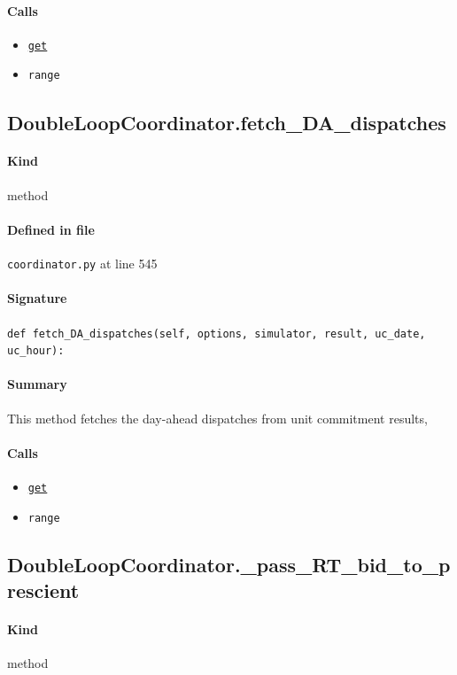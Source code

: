 \documentclass[11pt]{report}
\begin{document}
\paragraph{Calls}
\begin{itemize}[leftmargin=*]
  \item \hyperref[def:tests-test_backcaster.py:DAPrices.get:L294]{\texttt{get}}
  \item \texttt{range}
\end{itemize}
\subsection{DoubleLoopCoordinator.fetch\_DA\_dispatches}
\label{def:coordinator.py:DoubleLoopCoordinator.fetch_DA_dispatches:L545}
\paragraph{Kind} method
\paragraph{Defined in file} \texttt{coordinator.py} at line 545
\paragraph{Signature} \texttt{def fetch\_DA\_dispatches(self, options, simulator, result, uc\_date, uc\_hour):}
\paragraph{Summary} This method fetches the day-ahead dispatches from unit commitment results,
\paragraph{Calls}
\begin{itemize}[leftmargin=*]
  \item \hyperref[def:tests-test_backcaster.py:DAPrices.get:L294]{\texttt{get}}
  \item \texttt{range}
\end{itemize}
\subsection{DoubleLoopCoordinator.\_pass\_RT\_bid\_to\_prescient}
\label{def:coordinator.py:DoubleLoopCoordinator._pass_RT_bid_to_prescient:L587}
\paragraph{Kind} method
\end{document}
